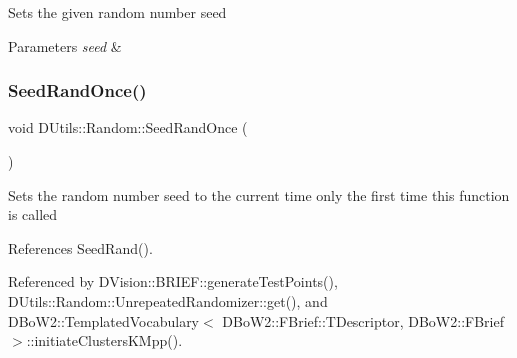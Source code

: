 Sets the given random number seed 
\begin{DoxyParams}{Parameters}
{\em seed} & \\
\hline
\end{DoxyParams}
\mbox{\label{classDUtils_1_1Random_a168e77d82ce1e66c6759e97ef27adbbc}} 
\subsubsection{\texorpdfstring{Seed\+Rand\+Once()}{SeedRandOnce()}\hspace{0.1cm}{\footnotesize\ttfamily [1/2]}}
{\footnotesize\ttfamily void D\+Utils\+::\+Random\+::\+Seed\+Rand\+Once (\begin{DoxyParamCaption}{ }\end{DoxyParamCaption})\hspace{0.3cm}{\ttfamily [static]}}

Sets the random number seed to the current time only the first time this function is called 

References Seed\+Rand().



Referenced by D\+Vision\+::\+B\+R\+I\+E\+F\+::generate\+Test\+Points(), D\+Utils\+::\+Random\+::\+Unrepeated\+Randomizer\+::get(), and D\+Bo\+W2\+::\+Templated\+Vocabulary$<$ D\+Bo\+W2\+::\+F\+Brief\+::\+T\+Descriptor, D\+Bo\+W2\+::\+F\+Brief $>$\+::initiate\+Clusters\+K\+Mpp().

